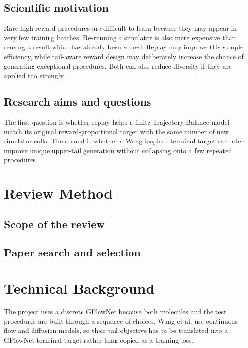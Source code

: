 \documentclass{article}
\begin{document}
\subsection{Scientific motivation}

Rare high-reward procedures are difficult to learn because they may appear in very few training batches. Re-running a simulator is also more expensive than reusing a result which has already been scored. Replay may improve this sample efficiency, while tail-aware reward design may deliberately increase the chance of generating exceptional procedures. Both can also reduce diversity if they are applied too strongly.

\subsection{Research aims and questions}

The first question is whether replay helps a finite Trajectory-Balance model match its original reward-proportional target with the same number of new simulator calls. The second is whether a Wang-inspired terminal target can later improve unique upper-tail generation without collapsing onto a few repeated procedures.

\section{Review Method}

\subsection{Scope of the review}

\subsection{Paper search and selection}

\section{Technical Background}

The project uses a discrete GFlowNet because both molecules and the test procedures are built through a sequence of choices. Wang et al. use continuous flow and diffusion models, so their tail objective has to be translated into a GFlowNet terminal target rather than copied as a training loss.
\end{document}
